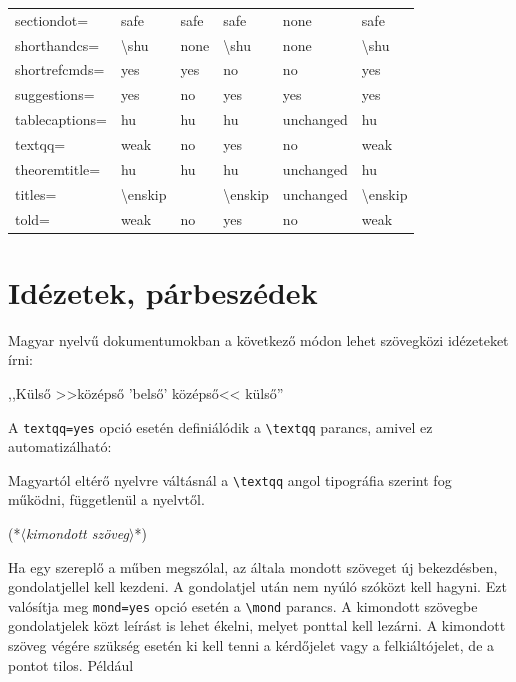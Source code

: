\documentclass[12pt]{article}
\newcommand\param[1]{{\normalfont\slshape$\langle$#1$\rangle$}}
\begin{document}
{\begin{longtable}{|l|l|l|l|l|l|}
sectiondot= & safe & safe & safe & none & safe \\
shorthandcs= & \textbackslash shu & none & \textbackslash shu & none & \textbackslash shu \\
shortrefcmds= & yes & yes & no & no & yes \\
suggestions= & yes & no & yes & yes & yes \\
tablecaptions= & hu & hu & hu & unchanged & hu \\
textqq= & weak & no & yes & no & weak \\
theoremtitle= & hu & hu & hu & unchanged & hu \\
titles= & \textbackslash enskip & \quad & \textbackslash enskip & unchanged & \textbackslash enskip \\
told= & weak & no & yes & no & weak \\
\hline
\end{longtable}}

\section{Idézetek, párbeszédek}\label{sec-idezet-parbeszed}

\begin{latexcode}
\textqq{(*\param{szövegközi idézet}*)}
\end{latexcode}
Magyar nyelvű dokumentumokban a következő módon lehet szövegközi idézeteket írni:

\begin{latexexample}
,,Külső >>középső 'belső' 
középső<< külső''
\end{latexexample}
A \texttt{textqq=yes} opció esetén definiálódik a \verb|\textqq| parancs, amivel ez automatizálható:

\begin{latexexample}
\end{latexexample}
Magyartól eltérő nyelvre váltásnál a \verb|\textqq| angol tipográfia szerint fog működni, függetlenül a nyelvtől.

\begin{latexcode}
\mond (*\param{kimondott szöveg}*)
\end{latexcode}
Ha egy szereplő a műben megszólal, az általa mondott szöveget új bekezdésben, gondolatjellel kell kezdeni.
A gondolatjel után nem nyúló szóközt kell hagyni.
Ezt valósítja meg \texttt{mond=yes} opció esetén a \verb|\mond| parancs.
A kimondott szövegbe gondolatjelek közt leírást is lehet ékelni, melyet ponttal kell lezárni.
A kimondott szöveg végére szükség esetén ki kell tenni a kérdőjelet vagy a felkiáltójelet, de a pontot tilos.
Például
\end{document}

